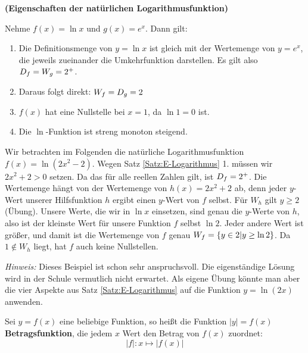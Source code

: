 \documentclass[ngerman, 12pt]{nssheetxea}
\begin{document}
\begin{theorem} \textbf{(Eigenschaften der natürlichen Logarithmusfunktion)} \par
Nehme $f(x)=\ln x$ und $g(x)=e^x$. Dann gilt:
\begin{enumerate}
\item Die Definitionsmenge von $y=\ln x$ ist gleich mit der Wertemenge von $y=e^x$, die jeweils zueinander die Umkehrfunktion darstellen. Es gilt also $D_f = W_g=2^+$.
\item Daraus folgt direkt: $W_f=D_g=2$
\item $f(x)$ hat eine Nullstelle bei $x=1$, da $\ln 1 = 0$ ist.
\item Die $\ln$-Funktion ist streng monoton steigend.
\end{enumerate}
\label{Satz:E-Logarithmus}
\end{theorem}

\begin{example}
Wir betrachten im Folgenden die natürliche Logarithmusfunktion $f(x)=\ln (2x^2-2)$. Wegen Satz \ref{Satz:E-Logarithmus} 1. müssen wir $2x^2+2>0$ setzen. Da das für alle reellen Zahlen gilt, ist $D_f=2^+$. Die Wertemenge hängt von der Wertemenge von $h(x)=2x^2+2$ ab, denn jeder $y$-Wert unserer Hilfsfunktion $h$ ergibt einen $y$-Wert von $f$ selbst. Für $W_h$ gilt $y\geq 2$ (Übung). Unsere Werte, die wir in $\ln x$ einsetzen, sind genau die $y$-Werte von $h$, also ist der kleinste Wert für unsere Funktion $f$ selbst $\ln 2$. Jeder andere Wert ist größer, und damit ist die Wertemenge von $f$ genau $W_f=\{ y \in 2 | y \geq \ln 2  \}$. Da $1 \notin W_h$ liegt, hat $f$ auch keine Nullstellen. \par
\textit{Hinweis:} Dieses Beispiel ist schon sehr anspruchsvoll. Die eigenständige Lösung wird in der Schule vermutlich nicht erwartet. Als eigene Übung könnte man aber die vier Aspekte aus Satz \ref{Satz:E-Logarithmus} auf die Funktion $y=\ln (2x)$ anwenden.
\end{example}


\begin{definition}
Sei $y=f(x)$ eine beliebige Funktion, so heißt die Funktion $|y|=f(x)$ \textbf{Betragsfunktion}, die jedem $x$ Wert den Betrag von $f(x)$ zuordnet:
\[ |f|: x \mapsto |f(x)|\]
 
\end{definition}
\end{document}
